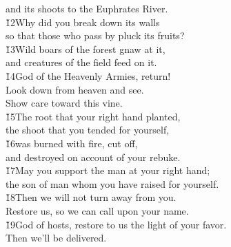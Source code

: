 \begin{poetry}
\poemll    and its shoots to the Euphrates River. \\
\poeml \v{12}Why did you break down its walls \\
\poemll    so that those who pass by pluck its fruits? \\
\poeml \v{13}Wild boars of the forest gnaw at it, \\
\poemll    and creatures of the field feed on it. \\
\poeml \v{14}God of the Heavenly Armies, return! \\
\poemll    Look down from heaven and see. \\
\poemlll       Show care toward this vine. \\
\poeml \v{15}The root that your right hand planted, \\
\poemll    the shoot that you tended for yourself, \\
\poeml \v{16}was burned with fire, cut off, \\
\poemll    and destroyed on account of your rebuke. \\
\poeml \v{17}May you support the man at your right hand; \\
\poemll    the son of man whom you have raised for yourself. \\
\poeml \v{18}Then we will not turn away from you. \\
\poemll    Restore us, so we can call upon your name. \\
\poeml \v{19}God of hosts, restore to us the light of your favor. \\
\poemll    Then we'll be delivered.
\end{poetry}

